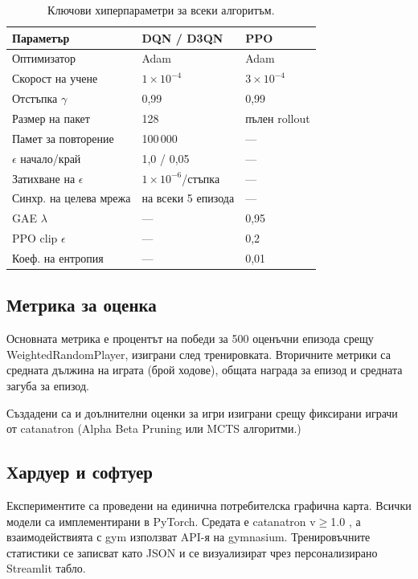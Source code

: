 \documentclass[11pt,a4paper]{article}
\begin{document}
\begin{table}[h]
\centering
\caption{Ключови хиперпараметри за всеки алгоритъм.}
\label{tab:hparams}
\begin{tabular}{lll}
\toprule
Параметър & DQN / D3QN & PPO \\
\midrule
Оптимизатор             & Adam              & Adam \\
Скорост на учене        & $1 \times 10^{-4}$ & $3 \times 10^{-4}$ \\
Отстъпка $\gamma$       & 0{,}99            & 0{,}99 \\
Размер на пакет         & 128               & пълен rollout \\
Памет за повторение     & 100\,000          & --- \\
$\epsilon$ начало/край  & 1{,}0 / 0{,}05    & --- \\
Затихване на $\epsilon$ & $1 \times 10^{-6}$/стъпка & --- \\
Синхр. на целева мрежа  & на всеки 5 епизода & --- \\
GAE $\lambda$           & ---               & 0{,}95 \\
PPO clip $\epsilon$     & ---               & 0{,}2 \\
Коеф. на ентропия       & ---               & 0{,}01 \\
\bottomrule
\end{tabular}
\end{table}


\subsection{Метрика за оценка}

Основната метрика е процентът на победи за 500 оценъчни епизода
срещу WeightedRandomPlayer, изиграни след тренировката. Вторичните метрики са
средната дължина на играта (брой ходове), общата награда за епизод и средната
загуба за епизод.

Създадени са и доълнителни оценки за игри изиграни срещу фиксирани играчи от catanatron (Alpha Beta Pruning или MCTS алгоритми.)

\subsection{Хардуер и софтуер}

Експериментите са проведени на единична потребителска графична карта. Всички модели са
имплементирани в PyTorch. Средата е catanatron v$\geq$1.0
\citep{collazo2021catanatron}, а взаимодействията с gym използват API-я на
{gymnasium}. Тренировъчните статистики се записват като JSON
и се визуализират чрез персонализирано Streamlit табло.
\end{document}
